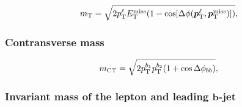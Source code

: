 \begin{equation}
	m_{\textrm{T}} = \sqrt{2p_{\textrm{T}}^\ell E_{\textrm{T}}^{\textrm{miss}}(1-\cos[\Delta\phi(\boldsymbol{p}_\mathrm{T}^\ell,\boldsymbol{p}_\mathrm{T}^\mathrm{miss})])},
\end{equation}

\subsubsection{Contransverse mass}

\begin{equation}
	m_{\textrm{CT}} = \sqrt{2p_{\textrm{T}}^{b_1}p_{\textrm{T}}^{b_2}(1+\cos\Delta\phi_{bb})},
\end{equation}

\subsubsection[Invariant mass of the lepton and leading \textit{b}-jet]{Invariant mass of the lepton and leading $\boldsymbol{b}$-jet}

